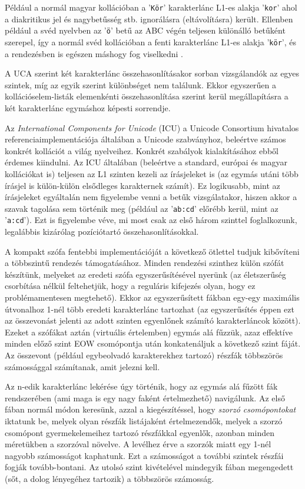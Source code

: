 \documentclass[
    parspace,
    noindent,
    nohyp,
]{elteiktdk}[2023/04/10]
\begin{document}
Például a normál magyar kollációban a '\texttt{Kör}' karakterlánc L1-es alakja '\texttt{kor}'
ahol a diakritikus jel és nagybetűsség stb. ignorálásra (eltávolításra) került.
Ellenben például a svéd nyelvben az '\texttt{ö}' betű az ABC végén
teljesen különálló betűként szerepel,
így a normál svéd kollációban a fenti karakterlánc L1-es alakja '\texttt{kör}',
és a rendezésben is egészen máshogy fog viselkedni%
\cite{UCA2024SvCollation}.

A UCA szerint két karakterlánc összehasonlításakor sorban vizsgálandók az egyes szintek,
míg az egyik szerint különbséget nem találunk.
Ekkor egyszerűen a kollációselem-listák elemenkénti összehasonlítása szerint
kerül megállapításra a két karakterlánc egymáshoz képesti sorrendje.

Az \textit{International Components for Unicode} (ICU) a Unicode Consortium hivatalos
referenciaimplementációja általában a Unicode szabványhoz,
beleértve számos konkrét kollációt a világ nyelveihez\cite{ICU2024}.
Konkrét szabályok kialakításához ebből érdemes kiindulni.
Az ICU általában (beleértve a standard, európai és magyar kollációkat is)
teljesen az L1 szinten kezeli az írásjeleket is
(az egymás utáni több írásjel is külön-külön elsődleges karakternek számít).
Ez logikusabb, mint az írásjeleket egyáltalán nem figyelembe venni a betűk vizsgálatakor,
hiszen akkor a szavak tagolása sem történik meg
(például az '\texttt{ab:cd}' előrébb kerül, mint az '\texttt{a:cd}').
Ezt is figyelembe véve, mi most csak az első három szinttel foglalkozunk,
legalábbis kizárólag pozíciótartó összehasonlításokkal.

A kompakt szófa fentebbi implementációját a következő ötlettel tudjuk kibővíteni
a többszintű rendezés támogatásához.
Minden rendezési szinthez külön szófát készítünk, melyeket az eredeti szófa egyszerűsítésével nyerünk
(az életszerűség csorbítása nélkül feltehetjük,
hogy a reguláris kifejezés olyan, hogy ez problémamentesen megtehető).
Ekkor az egyszerűsített fákban egy-egy maximális útvonalhoz 1-nél több eredeti karakterlánc tartozhat
(az egyszerűsítés éppen ezt az összevonást jelenti
az adott szinten egyenlőnek számító karakterláncok között).
Ezeket a szófákat aztán (virtuális értelemben) egymás alá fűzzük,
azaz effektíve minden előző szint EOW csomópontja után konkatenáljuk a következő szint fáját.
Az összevont (például egybeolvadó karakterekhez tartozó) részfák
többszörös számossággal számítanak, amit jelezni kell.

Az n-edik karakterlánc lekérése úgy történik,
hogy az egymás alá fűzött fák rendszerében (ami maga is egy nagy faként értelmezhető) navigálunk.
Az első fában normál módon keresünk, azzal a kiegészítéssel,
hogy \textit{szorzó csomópontokat} iktatunk be, melyek olyan részfák listájaként értelmezendők,
melyek a szorzó csomópont gyermekelemeihez tartozó részfákkal egyenlők,
azonban minden méretükben a szorzóval növelve.
A levélhez érve a szorzók miatt egy 1-nél nagyobb számosságot kaphatunk.
Ezt a számosságot a további szintek részfái fogják tovább-bontani.
Az utolsó szint kivételével mindegyik fában megengedett (sőt, a dolog lényegéhez tartozik)
a többszörös számosság.
\end{document}
